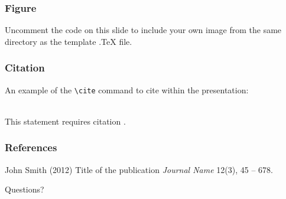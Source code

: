 \documentclass{beamer}
\begin{document}
\begin{frame}
\frametitle{Figure}
Uncomment the code on this slide to include your own image from the same directory as the template .TeX file.
\end{frame}


\begin{frame}[fragile] %
\frametitle{Citation}
An example of the \verb|\cite| command to cite within the presentation:\\~

This statement requires citation \cite{p1}.
\end{frame}


\begin{frame}
\frametitle{References}
\footnotesize{
\begin{thebibliography}{99} %
 John Smith (2012)
\newblock Title of the publication
\newblock \emph{Journal Name} 12(3), 45 -- 678.
\end{thebibliography}
}
\end{frame}


\begin{frame}
\Huge{\centerline{Questions?}}
\end{frame}

\end{document}
